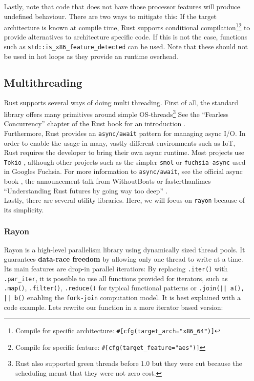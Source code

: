 Lastly, note that code that does not have those processor features will produce undefined behaviour. There are two ways to mitigate this: If the target architecture is known at compile time, Rust supports conditional compilation\footnote{Compile for specific architecture: \texttt{\#[cfg(target\_arch="x86\_64")]}}\footnote{Compile for specific feature: \texttt{\#[cfg(target\_feature="aes")]}} to provide alternatives to architecture specific code. If this is not the case, functions such as \texttt{std::is\_x86\_feature\_detected} can be used. Note that these should not be used in hot loops as they provide an runtime overhead.

\subsection{Multithreading}

Rust supports several ways of doing multi threading. First of all, the standard library offers many primitives around simple OS-threads\footnote{Rust also supported green threads before 1.0 but they were cut because the scheduling menat that they were not zero cost.} See the ``Fearless Concurrency'' chapter of the Rust book for an introduction \cite{conbook}.\\

Furthermore, Rust provides an \texttt{async/await} pattern for managing async \ac{I/O}. In order to enable the usage in many, vastly different environments such as \ac{IoT}, Rust requires the developer to bring their own async runtime. Most projects use \texttt{Tokio} \cite{tokio}, although other projects such as the simpler \texttt{smol} or \texttt{fuchsia-async} \cite{fuchsia} used in Googles Fuchsia. For more information to \texttt{async/await}, see the official async book \cite{asyncbook}, the announcement talk from WithoutBoats \cite{withoutboats} or fasterthanlimes ``Understanding Rust futures by going way too deep'' \cite{fasterthanlime}.\\

Lastly, there are several utility libraries. Here, we will focus on \texttt{rayon} because of its simplicity.

\subsubsection{Rayon}

Rayon is a high-level parallelism library using dynamically sized thread pools. It guarantees \textbf{data-race freedom} by allowing only one thread to write at a time. Its main features are drop-in parallel iteratiors: By replacing \texttt{.iter()} with \texttt{.par\_iter}, it is possible to use all functions provided for iterators, such as \texttt{.map()}, \texttt{.filter()}, \texttt{.reduce()} for typical functional patterns or \texttt{.join(|| a(), || b()} enabling the \texttt{fork-join} computation model.
It is best explained with a code example. Lets rewrite our function in a more iterator based version:

